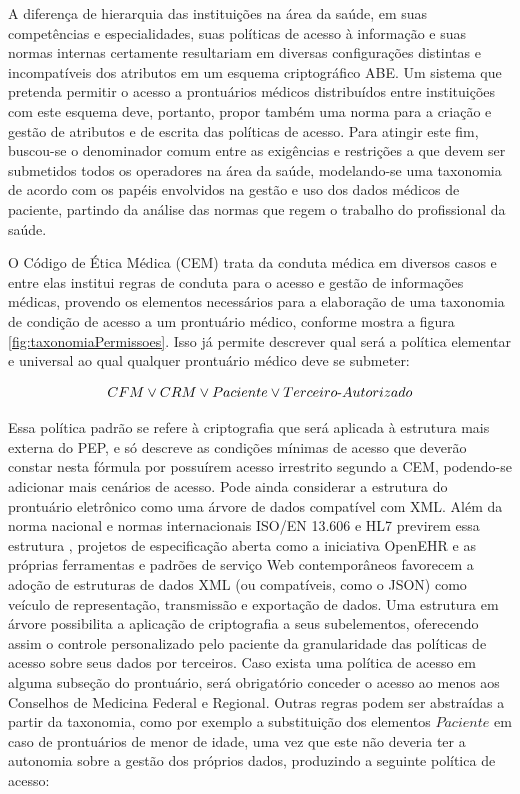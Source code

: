 \documentclass[a4paper,11pt]{article}
\begin{document}
A diferença de hierarquia das instituições na área da saúde, em suas competências e especialidades,  suas políticas de acesso à informação e suas normas internas certamente resultariam em diversas configurações distintas e incompatíveis dos atributos em um esquema criptográfico ABE.
Um sistema que pretenda permitir o acesso a prontuários médicos distribuídos entre instituições com este esquema deve, portanto, propor também uma norma para a criação e gestão de atributos e de escrita das políticas de acesso.
Para atingir este fim, buscou-se o denominador comum entre as exigências e restrições a que devem ser submetidos todos os operadores na área da saúde, modelando-se uma taxonomia de acordo com os papéis envolvidos na gestão e uso dos dados médicos de paciente, partindo da análise das normas que regem o trabalho do profissional da saúde.

O Código de Ética Médica (CEM) trata da conduta médica em diversos casos e entre elas institui regras de conduta para o acesso e gestão de informações médicas, provendo os elementos necessários para a elaboração de uma taxonomia de condição de acesso a um prontuário médico, conforme mostra a figura \ref{fig:taxonomiaPermissoes}.
Isso já permite descrever qual será a política elementar e universal ao qual qualquer prontuário médico deve se submeter:

\[ CFM \vee CRM \vee Paciente \vee Terceiro\textnormal{-}Autorizado \]

Essa política padrão se refere à criptografia que será aplicada à estrutura mais externa do PEP, e só descreve as condições mínimas de acesso que deverão constar nesta fórmula por possuírem acesso irrestrito segundo a CEM, podendo-se adicionar mais cenários de acesso.
Pode ainda considerar a estrutura do prontuário eletrônico como uma árvore de dados compatível com XML.
Além da norma nacional \cite{SociedadeBrasileiradeInformaticaemSaude2016} e normas internacionais ISO/EN 13.606 e HL7 previrem essa estrutura \cite{Munoz2011, Dolin2000}, projetos de especificação aberta como a iniciativa OpenEHR \cite{openEHRFoundation2020} e as próprias ferramentas e padrões de serviço Web contemporâneos favorecem a adoção de estruturas de dados XML (ou compatíveis, como o JSON) como veículo de representação, transmissão e exportação de dados.
Uma estrutura em árvore possibilita a aplicação de criptografia a seus subelementos, oferecendo assim o controle personalizado pelo paciente da granularidade das políticas de acesso sobre seus dados por terceiros.
Caso exista uma política de acesso em alguma subseção do prontuário, será obrigatório conceder o acesso ao menos aos Conselhos de Medicina Federal e Regional.
Outras regras podem ser abstraídas a partir da taxonomia, como por exemplo a substituição dos elementos $Paciente$ em caso de prontuários de menor de idade, uma vez que este não deveria ter a autonomia sobre a gestão dos próprios dados, produzindo a seguinte política de acesso:
\end{document}
